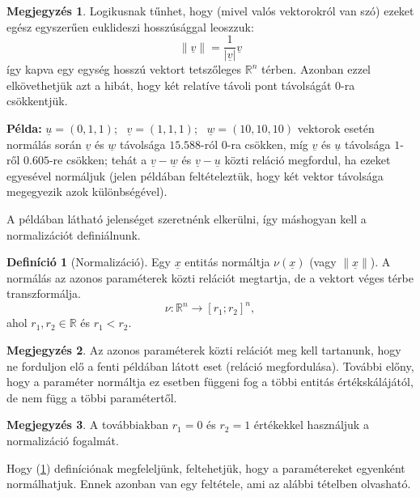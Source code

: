\documentclass[twocolumn]{article}
\theoremstyle{definition}
\newtheorem{definition}{Definíció}[section]
\newtheorem*{megj}{Megjegyzés}
\newcommand{\vect}[1]{ \underline{#1} }
\newcommand{\norm}[1]{ \parallel {#1} \parallel }
\newcommand{\pl}{ \textbf{Példa:} }
\begin{document}
    \begin{megj}
    Logikusnak tűnhet, hogy (mivel valós vektorokról van szó) ezeket egész egyszerűen euklideszi hosszúsággal leoszzuk:
    $$ \parallel\vect{v}\parallel = \frac{1}{|\vect{v}|} \vect{v} $$
    így kapva egy egység hosszú vektort tetszőleges $\mathbb{R}^n$ térben. Azonban ezzel elkövethetjük azt a hibát, hogy két relatíve távoli pont távolságát 0-ra csökkentjük.
    \end{megj}
    \pl $\vect u = (0, 1, 1)$; \ $\vect v = (1, 1, 1)$; \ $\vect w = (10, 10, 10)$
    vektorok esetén normálás során $\vect v$ és $\vect w$ távolsága $15.588$-ról $0$-ra csökken, míg $\vect v$ és $\vect u$ távolsága $1$-ről $0.605$-re csökken; tehát a $\vect v - \vect w$ és $\vect v - \vect u$ közti reláció megfordul, ha ezeket egyesével normáljuk (jelen példában feltételeztük, hogy két vektor távolsága megegyezik azok különbségével).
    
    A példában látható jelenséget szeretnénk elkerülni, így máshogyan kell a normalizációt definiálnunk.
    
    \begin{definition}[Normalizáció]\label{def:norm}
        Egy $\vect x$ entitás normáltja $\nu(\vect x)$ (vagy $\norm{\vect x}$). A normálás az azonos paraméterek közti relációt megtartja, de a vektort véges térbe transzformálja.
        \begin{equation}
            \nu : \mathbb{R}^n \to [r_1; r_2]^n,
        \end{equation}
        ahol $r_1, r_2 \in \mathbb{R}$ és $r_1 < r_2$.
        
        \begin{megj}
            Az azonos paraméterek közti relációt meg kell tartanunk, hogy ne forduljon elő a fenti példában látott eset (reláció megfordulása). További előny, hogy a paraméter normáltja ez esetben függeni fog a többi entitás értékskálájától, de nem függ a többi paramétertől.
        \end{megj}
        
        \begin{megj}
            A továbbiakban $r_1 = 0$ és $r_2 = 1$ értékekkel használjuk a normalizáció fogalmát.
        \end{megj}
    \end{definition}
    
    Hogy \az (\ref{def:norm}) definíciónak megfeleljünk, feltehetjük, hogy a paramétereket egyenként normálhatjuk. Ennek azonban van egy feltétele, ami az alábbi tételben olvasható.
    
\end{document}
